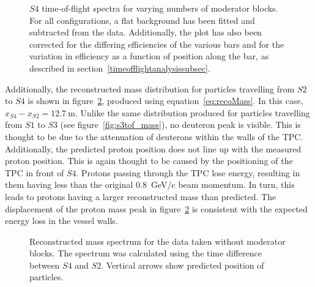 \begin{figure}[ht]
  \begin{adjustbox}{max totalsize={\textwidth}{.5\textheight},center}
    
  \end{adjustbox}
  \caption{$\mathit{S4}$ time-of-flight spectra for varying numbers of moderator blocks. For all configurations, a flat background has been fitted and subtracted from the data. Additionally, the plot has also been corrected for the differing efficiencies of the various bars and for the variation in efficiency as a function of position along the bar, as described in section~\ref{timeofflightanalysissubsec}.}
  \label{fig:s4tof}	
\end{figure}

Additionally, the reconstructed mass distribution for particles travelling from $\mathit{S2}$ to $\mathit{S4}$ is shown in figure~\ref{fig:s4tof_mass}, produced using equation~\ref{eq:recoMass}.
In this case, $x_{\mathit{S4}}-x_{\mathit{S2}} = 12.7~\text{m}$.
Unlike the same distribution produced for particles travelling from $\mathit{S1}$ to $\mathit{S3}$ (see figure~\ref{fig:s3tof_mass}), no deuteron peak is visible.
This is thought to be due to the attenuation of deuterons within the walls of the TPC.
Additionally, the predicted proton position does not line up with the measured proton position. 
This is again thought to be caused by the positioning of the TPC in front of $\mathit{S4}$.
Protons passing through the TPC lose energy, resulting in them having less than the original 0.8~GeV/c beam momentum.
In turn, this leads to protons having a larger reconstructed mass than predicted.
The displacement of the proton mass peak in figure~\ref{fig:s4tof_mass} is consistent with the expected energy loss in the vessel walls.

\begin{figure}[ht]
  \centering
  \begin{adjustbox}{max totalsize={.9\textwidth}{.5\textheight},center}
    
  \end{adjustbox}
  \caption{Reconstructed mass spectrum for the data taken without moderator blocks. The spectrum was calculated using the time difference between $\mathit{S4}$ and $\mathit{S2}$. Vertical arrows show predicted position of particles.}
  \label{fig:s4tof_mass}
\end{figure}


